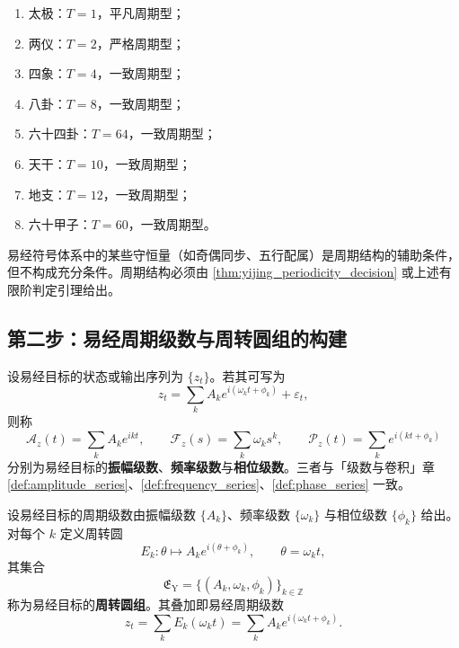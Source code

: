 \begin{example}[太极至六十四卦的周期判定]\label{ex:yijing_taiji_to_64}
\begin{enumerate}[label=(\roman*)]
    \item 太极：$T=1$，平凡周期型；
    \item 两仪：$T=2$，严格周期型；
    \item 四象：$T=4$，一致周期型；
    \item 八卦：$T=8$，一致周期型；
    \item 六十四卦：$T=64$，一致周期型；
    \item 天干：$T=10$，一致周期型；
    \item 地支：$T=12$，一致周期型；
    \item 六十甲子：$T=60$，一致周期型。
\end{enumerate}
\end{example}

\begin{remark}[不变量不保证周期]\label{rem:yijing_invariant_not_period}
易经符号体系中的某些守恒量（如奇偶同步、五行配属）是周期结构的辅助条件，但不构成充分条件。周期结构必须由 \cref{thm:yijing_periodicity_decision} 或上述有限阶判定引理给出。
\end{remark}

\subsection{第二步：易经周期级数与周转圆组的构建}

\begin{definition}\label{def:yijing_series}
设易经目标的状态或输出序列为 $\{z_t\}$。若其可写为
\[
z_t=\sum_k A_k e^{i(\omega_k t+\phi_k)}+\varepsilon_t,
\]
则称
\[
\mathcal A_z(t)=\sum_k A_k e^{ikt},\qquad
\mathcal F_z(s)=\sum_k \omega_k s^k,\qquad
\mathcal P_z(t)=\sum_k e^{i(kt+\phi_k)}
\]
分别为易经目标的\textbf{振幅级数}、\textbf{频率级数}与\textbf{相位级数}。三者与「级数与卷积」章 \cref{def:amplitude_series}、\cref{def:frequency_series}、\cref{def:phase_series} 一致。
\end{definition}

\begin{definition}[易经周转圆组]\label{def:yijing_epicycle_group}
设易经目标的周期级数由振幅级数 $\{A_k\}$、频率级数 $\{\omega_k\}$ 与相位级数 $\{\phi_k\}$ 给出。对每个 $k$ 定义周转圆
\[
E_k:\theta\mapsto A_k e^{i(\theta+\phi_k)},\qquad \theta=\omega_k t,
\]
其集合
\[
\mathfrak E_{\mathrm{Y}}=\{(A_k,\omega_k,\phi_k)\}_{k\in\mathbb Z}
\]
称为易经目标的\textbf{周转圆组}。其叠加即易经周期级数
\[
z_t=\sum_k E_k(\omega_k t)=\sum_k A_k e^{i(\omega_k t+\phi_k)}.
\]
\end{definition}

